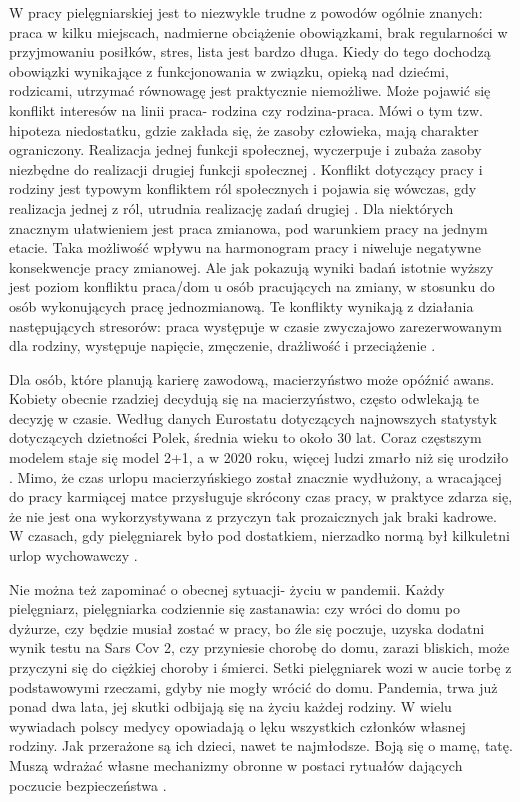 \documentclass[a4paper,12pt,twoside,openright]{mwrep}
\begin{document}
W pracy pielęgniarskiej jest to niezwykle trudne z powodów ogólnie znanych: praca w kilku miejscach, nadmierne obciążenie obowiązkami, brak regularności w przyjmowaniu posiłków, stres, lista jest bardzo długa. Kiedy do tego dochodzą obowiązki wynikające z funkcjonowania w związku, opieką nad dziećmi, rodzicami, utrzymać równowagę jest praktycznie niemożliwe. Może pojawić się konflikt interesów na linii praca- rodzina czy rodzina-praca. Mówi o tym tzw. hipoteza niedostatku,  gdzie zakłada się, że zasoby człowieka, mają charakter ograniczony. Realizacja jednej funkcji społecznej, wyczerpuje i zubaża zasoby niezbędne do realizacji drugiej funkcji społecznej \cite{hipoteza}. Konflikt dotyczący pracy i rodziny jest typowym konfliktem ról społecznych i pojawia się wówczas, gdy realizacja jednej z ról, utrudnia realizację zadań drugiej \cite{relacja}. Dla niektórych znacznym ułatwieniem jest praca zmianowa, pod warunkiem pracy na jednym etacie. Taka możliwość wpływu na harmonogram pracy i niweluje negatywne konsekwencje pracy zmianowej. Ale jak pokazują wyniki badań  istotnie wyższy jest poziom konfliktu praca/dom u osób pracujących na zmiany, w stosunku do osób wykonujących pracę jednozmianową. Te konflikty wynikają z działania następujących stresorów: praca występuje w czasie zwyczajowo zarezerwowanym dla rodziny, występuje napięcie, zmęczenie, drażliwość i przeciążenie \cite{konflikt}.
  
Dla osób, które planują karierę zawodową, macierzyństwo może opóźnić awans. Kobiety obecnie rzadziej decydują się na macierzyństwo, często odwlekają te decyzję w czasie. Według danych Eurostatu dotyczących najnowszych statystyk dotyczących dzietności Polek, średnia wieku to około 30 lat. Coraz częstszym modelem staje się model 2+1, a w 2020 roku, więcej ludzi zmarło niż się urodziło \cite{dzieci}. Mimo, że czas urlopu macierzyńskiego został znacznie wydłużony, a wracającej do pracy karmiącej matce przysługuje skrócony czas pracy, w praktyce zdarza się, że nie jest ona wykorzystywana z przyczyn tak prozaicznych jak braki kadrowe. W czasach, gdy pielęgniarek było pod dostatkiem, nierzadko normą był kilkuletni urlop wychowawczy \cite{urlop}.

Nie można też zapominać o obecnej sytuacji- życiu w pandemii. Każdy pielęgniarz, pielęgniarka codziennie się zastanawia: czy wróci do domu po dyżurze, czy będzie musiał zostać w pracy, bo źle się poczuje, uzyska dodatni wynik testu na Sars Cov 2, czy przyniesie chorobę do domu, zarazi bliskich, może przyczyni się do ciężkiej choroby i śmierci. Setki pielęgniarek wozi w aucie torbę z podstawowymi rzeczami, gdyby nie mogły wrócić do domu. Pandemia, trwa już ponad dwa lata, jej skutki odbijają się na życiu każdej rodziny. W wielu wywiadach polscy medycy opowiadają o lęku wszystkich członków własnej rodziny. Jak przerażone są ich dzieci, nawet te najmłodsze. Boją się o mamę, tatę. Muszą wdrażać własne mechanizmy obronne w postaci rytuałów dających poczucie bezpieczeństwa  \cite{wywiad}.
\end{document}
